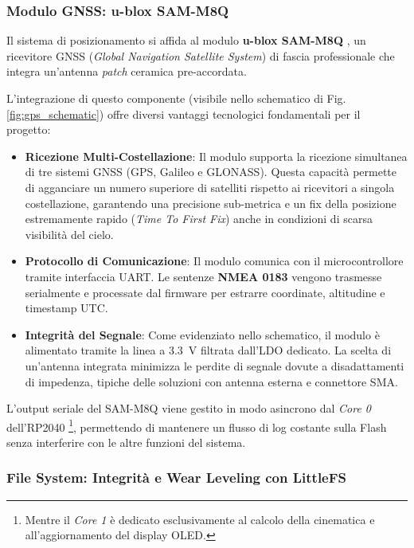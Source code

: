 \subsubsection*{Modulo GNSS: u-blox SAM-M8Q}
Il sistema di posizionamento si affida al modulo \textbf{u-blox SAM-M8Q} \cite{sam_m8q_ds}, un ricevitore GNSS (\textit{Global Navigation Satellite System}) di fascia professionale che integra un'antenna \textit{patch} ceramica pre-accordata. 

L'integrazione di questo componente (visibile nello schematico di Fig. \ref{fig:gps_schematic}) offre diversi vantaggi tecnologici fondamentali per il progetto:

\begin{itemize}
    \item \textbf{Ricezione Multi-Costellazione}: Il modulo supporta la ricezione simultanea di tre sistemi GNSS (GPS, Galileo e GLONASS). Questa capacità permette di agganciare un numero superiore di satelliti rispetto ai ricevitori a singola costellazione, garantendo una precisione sub-metrica e un fix della posizione estremamente rapido (\textit{Time To First Fix}) anche in condizioni di scarsa visibilità del cielo.
    \item \textbf{Protocollo di Comunicazione}: Il modulo comunica con il microcontrollore tramite interfaccia UART. Le sentenze \textbf{NMEA 0183} vengono trasmesse serialmente e processate dal firmware per estrarre coordinate, altitudine e timestamp UTC. 
    \item \textbf{Integrità del Segnale}: Come evidenziato nello schematico, il modulo è alimentato tramite la linea a \qty{3.3}{V} filtrata dall'LDO dedicato. La scelta di un'antenna integrata minimizza le perdite di segnale dovute a disadattamenti di impedenza, tipiche delle soluzioni con antenna esterna e connettore SMA.
\end{itemize}

L'output seriale del SAM-M8Q viene gestito in modo asincrono dal \textit{Core 0} dell'RP2040 \cite{rp2040_ds}\footnote{Mentre il \textit{Core 1} è dedicato esclusivamente al calcolo della cinematica e all'aggiornamento del display OLED.}, permettendo di mantenere un flusso di log costante sulla Flash senza interferire con le altre funzioni del sistema.

\subsubsection*{File System: Integrità e Wear Leveling con LittleFS}

